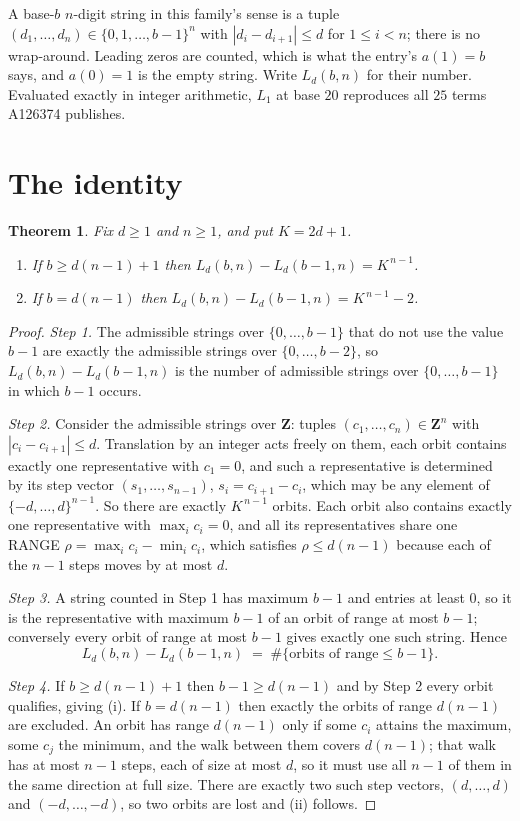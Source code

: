 \documentclass[11pt,a4paper]{article}
\theoremstyle{plain}
\newtheorem{theorem}{Theorem}
\theoremstyle{definition}
\begin{document}
A base-$b$ $n$-digit string in this family's sense is a tuple
$(d_1,\dots,d_n)\in\{0,1,\dots,b-1\}^{n}$ with $|d_i-d_{i+1}|\le d$ for $1\le i<n$; there
is no wrap-around. Leading zeros are counted, which is what the entry's $a(1)=b$ says, and
$a(0)=1$ is the empty string. Write $L_d(b,n)$ for their number. Evaluated exactly in integer
arithmetic, $L_{1}$ at base $20$ reproduces all $25$ terms A126374 publishes.

\section{The identity}

\begin{theorem}
Fix $d\ge1$ and $n\ge1$, and put $K=2d+1$.
\begin{enumerate}
\item[(i)] If $b\ge d(n-1)+1$ then $L_d(b,n)-L_d(b-1,n)=K^{\,n-1}$.
\item[(ii)] If $b=d(n-1)$ then $L_d(b,n)-L_d(b-1,n)=K^{\,n-1}-2$.
\end{enumerate}
\end{theorem}

\begin{proof}
\emph{Step 1.} The admissible strings over $\{0,\dots,b-1\}$ that do not use the value $b-1$
are exactly the admissible strings over $\{0,\dots,b-2\}$, so $L_d(b,n)-L_d(b-1,n)$ is the
number of admissible strings over $\{0,\dots,b-1\}$ in which $b-1$ occurs.

\emph{Step 2.} Consider the admissible strings over $\mathbf{Z}$: tuples
$(c_1,\dots,c_n)\in\mathbf{Z}^{n}$ with $|c_i-c_{i+1}|\le d$. Translation by an integer acts
freely on them, each orbit contains exactly one representative with $c_1=0$, and such a
representative is determined by its step vector $(s_1,\dots,s_{n-1})$, $s_i=c_{i+1}-c_i$,
which may be any element of $\{-d,\dots,d\}^{n-1}$. So there are exactly $K^{\,n-1}$ orbits.
Each orbit also contains exactly one representative with $\max_i c_i=0$, and all its
representatives share one RANGE $\rho=\max_ic_i-\min_ic_i$, which satisfies
$\rho\le d(n-1)$ because each of the $n-1$ steps moves by at most $d$.

\emph{Step 3.} A string counted in Step 1 has maximum $b-1$ and entries at least $0$, so it is
the representative with maximum $b-1$ of an orbit of range at most $b-1$; conversely every orbit
of range at most $b-1$ gives exactly one such string. Hence
\[
L_d(b,n)-L_d(b-1,n)\;=\;\#\{\text{orbits of range}\le b-1\} .
\]

\emph{Step 4.} If $b\ge d(n-1)+1$ then $b-1\ge d(n-1)$ and by Step 2 every orbit qualifies,
giving (i). If $b=d(n-1)$ then exactly the orbits of range $d(n-1)$ are excluded. An orbit has
range $d(n-1)$ only if some $c_i$ attains the maximum, some $c_j$ the minimum, and the walk
between them covers $d(n-1)$; that walk has at most $n-1$ steps, each of size at most $d$, so it
must use all $n-1$ of them in the same direction at full size. There are exactly two such step
vectors, $(d,\dots,d)$ and $(-d,\dots,-d)$, so two orbits are lost and (ii) follows.
\end{proof}
\end{document}
